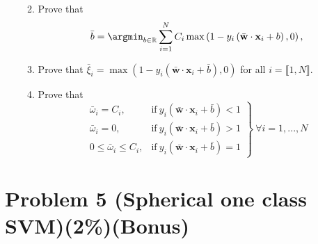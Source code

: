 \documentclass{article}
\newcommand{\real}{\mathbb{R}}
\def\vecw{{\mathbf w}}
\def\vecx{{\mathbf x}}
\def\real{{\mathbb {R}}}
\begin{document}
\begin{enumerate}
\begin{enumerate}
\begin{equation}
\end{equation}
%
\item Prove that
\begin{equation}\label{eq:sparse_svm_optimal_b}
{\bar b} = \argmin_{b \in \real}\sum_{i=1}^N C_i \max\left( 1-y_i\left({\bar \vecw} \cdot \vecx_i + b\right), 0 \right),
\end{equation}
%
\item Prove that ${\bar \xi}_i = \max\left(1-y_i\left({\bar \vecw} \cdot \vecx_i + {\bar b}\right),0\right)$ for all $i = \llbracket 1,N\rrbracket$.
\item Prove that
\begin{equation*}
\left.\begin{array}{lll}
{\bar \omega}_i = C_i, & \mbox{if}~ y_i\left({\bar \vecw} \cdot \vecx_i + {\bar b}\right) < 1\\
{\bar \omega}_i = 0, 	& \mbox{if}~ y_i\left({\bar \vecw} \cdot \vecx_i + {\bar b}\right) > 1\\
0 \leq {\bar \omega}_i \leq C_i, & \mbox{if}~ y_i\left({\bar \vecw} \cdot \vecx_i + {\bar b}\right) = 1
\end{array}\right\} ~ \forall i=1,...,N
\end{equation*}
\end{enumerate}
\end{enumerate}
%

\section*{Problem 5 (Spherical one class SVM)(2\%)(Bonus)}
\end{document}
